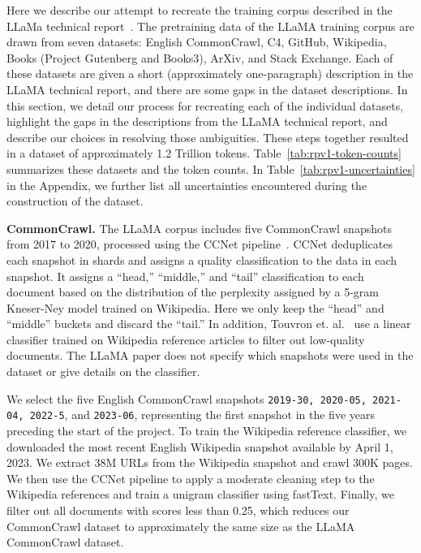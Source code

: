 \documentclass{article}
\begin{document}
Here we describe our attempt to recreate the training corpus described in the LLaMa technical report~\cite{touvron2023allama}.
The pretraining data of the LLaMA training corpus are drawn from seven datasets: English CommonCrawl, C4, GitHub, Wikipedia, Books (Project Gutenberg and Books3), ArXiv, and Stack Exchange.
Each of these datasets are given a short (approximately one-paragraph) description in the LLaMA technical report, and there are some gaps in the dataset descriptions.
In this section, we detail our process for recreating each of the individual datasets, highlight the gaps in the descriptions from the LLaMA technical report, and describe our choices in resolving those ambiguities.
These steps together resulted in a dataset of approximately 1.2 Trillion tokens. Table~\ref{tab:rpv1-token-counts} summarizes these datasets and the token counts. In Table~\ref{tab:rpv1-uncertainties} in the Appendix, we further list all uncertainties encountered during the construction of the dataset.


{\bf CommonCrawl.} The LLaMA corpus includes five CommonCrawl snapshots from 2017 to 2020, processed using the CCNet pipeline~\cite{wenzek2019ccnet}.
CCNet deduplicates each snapshot in shards and assigns a quality classification to the data in each snapshot. It assigns a ``head,'' ``middle,'' and ``tail'' classification to each document based on the distribution of the perplexity assigned by a 5-gram Kneser-Ney model trained on Wikipedia. Here we only keep the ``head'' and ``middle'' buckets and discard the ``tail.''
In addition, Touvron et. al.~\cite{touvron2023allama} use a linear classifier trained on Wikipedia reference articles to filter out low-quality documents.
The LLaMA paper does not specify which snapshots were used in the dataset or give details on the classifier.

We select the five English CommonCrawl snapshots \texttt{2019-30, 2020-05, 2021-04, 2022-5}, and \texttt{2023-06}, representing the first snapshot in the five years preceding the start of the project. %
To train the Wikipedia reference classifier, we downloaded the most recent English Wikipedia snapshot available by April 1, 2023.
We extract 38M URLs from the Wikipedia snapshot and crawl 300K pages. We then use the CCNet pipeline to apply a moderate cleaning step to the Wikipedia references and train a unigram classifier using fastText.
Finally, we filter out all documents with scores less than 0.25, which reduces our CommonCrawl dataset to approximately the same size as the LLaMA CommonCrawl dataset.
\end{document}
